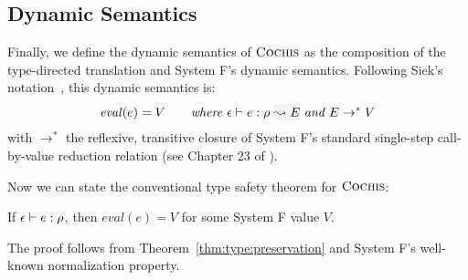 \subsection{Dynamic Semantics}
Finally, we define the dynamic semantics of $\textsc{Cochis}$ as the composition of
the type-directed translation and System F's dynamic semantics.  Following
Siek's notation~\cite{systemfg}, this dynamic semantics is:
\[ \mathit{eval}(e) = V \quad\quad \textit{where } \wte{\epsilon}{e}{\rulet}{E} \textit{ and } E \rightarrow^* V  \]
with $\rightarrow^*$ the reflexive, transitive closure of System F's standard single-step call-by-value reduction relation (see Chapter 23 of \cite{tapl}).

Now we can state the conventional type safety theorem for $\textsc{Cochis}$:
\begin{theorem}
If ${\epsilon \vdash e:\rho}$, then $\mathit{eval}(e) = V$ for
some System F value $V$.
\end{theorem}
The proof follows from Theorem~\ref{thm:type:preservation} and System F's well-known
normalization property.


